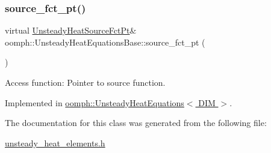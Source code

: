 \subsubsection{\texorpdfstring{source\+\_\+fct\+\_\+pt()}{source\_fct\_pt()}}
{\footnotesize\ttfamily virtual \hyperlink{classoomph_1_1UnsteadyHeatEquationsBase_accf23819639b695221238a0e7b1c8384}{Unsteady\+Heat\+Source\+Fct\+Pt}\& oomph\+::\+Unsteady\+Heat\+Equations\+Base\+::source\+\_\+fct\+\_\+pt (\begin{DoxyParamCaption}{ }\end{DoxyParamCaption})\hspace{0.3cm}{\ttfamily [pure virtual]}}



Access function\+: Pointer to source function. 



Implemented in \hyperlink{classoomph_1_1UnsteadyHeatEquations_a8bd87b25f079be4dbee6edfc00127d47}{oomph\+::\+Unsteady\+Heat\+Equations$<$ D\+I\+M $>$}.



The documentation for this class was generated from the following file\+:\begin{DoxyCompactItemize}
\item 
\hyperlink{unsteady__heat__elements_8h}{unsteady\+\_\+heat\+\_\+elements.\+h}\end{DoxyCompactItemize}
